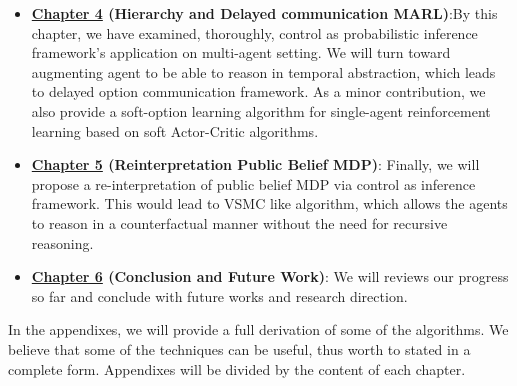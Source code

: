 \begin{itemize}
    \item \textbf{\hyperref[chapter:chap4]{Chapter 4} (Hierarchy and Delayed communication MARL)}:By this chapter, we have examined, thoroughly, control as probabilistic inference framework's application on multi-agent setting. We will turn toward augmenting agent to be able to reason in temporal abstraction, which leads to delayed option communication framework. As a minor contribution, we also provide a soft-option learning algorithm for single-agent reinforcement learning based on soft Actor-Critic algorithms.
    \item \textbf{\hyperref[chapter:chap5]{Chapter 5} (Reinterpretation Public Belief MDP)}: Finally, we will propose a re-interpretation of public belief MDP via control as inference framework. This would lead to VSMC like algorithm, which allows the agents to reason in a counterfactual manner without the need for recursive reasoning.
    \item \textbf{\hyperref[chapter:chap6]{Chapter 6} (Conclusion and Future Work)}: We will reviews our progress so far and conclude with future works and research direction. 
\end{itemize}
In the appendixes, we will provide a full derivation of some of the algorithms. We believe that some of the techniques can be useful, thus worth to stated in a complete form. Appendixes will be divided by the content of each chapter. 